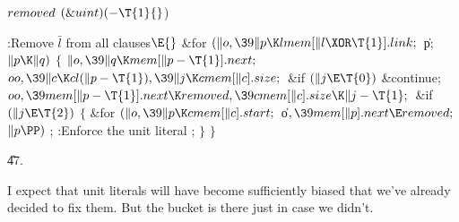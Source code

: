 \Y\B\4\D$\\{removed}$ \5
$(\&{uint})({-}\T{1}{}$)\par
\Y\B\4:Remove $\bar l$ from all clauses\X${}\E{}$\6
\&{for} ${}(\|o,\39\|p\K\\{lmem}[\|l\XOR\T{1}].\\{link};{}$ \|p; ${}\|p\K%
\|q){}$\5
${}\{{}$\1\6
${}\|o,\39\|q\K\\{mem}[\|p-\T{1}].\\{next};{}$\6
${}\\{oo},\39\|c\K\\{cl}(\|p-\T{1}),\39\|j\K\\{cmem}[\|c].\\{size};{}$\6
\&{if} ${}(\|j\E\T{0}){}$\1\5
\&{continue};\2\6
${}\\{oo},\39\\{mem}[\|p-\T{1}].\\{next}\K\\{removed},\39\\{cmem}[\|c].\\{size}%
\K\|j-\T{1};{}$\6
\&{if} ${}(\|j\E\T{2}){}$\5
${}\{{}$\1\6
\&{for} ${}(\|o,\39\|p\K\\{cmem}[\|c].\\{start};{}$ \|o${},\39\\{mem}[\|p].%
\\{next}\E\\{removed};{}$ ${}\|p\PP){}$\1\5
;\2\6
:Enforce the unit literal \X;\6
\4${}\}{}$\2\6
\4${}\}{}$\2\par
\U47.\fi

I expect that unit literals will have become sufficiently biased that
we've already decided to fix them. But the  bucket is there just
in case we didn't.


